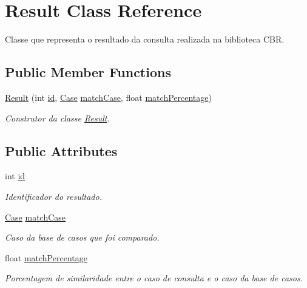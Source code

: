\hypertarget{class_result}{}\section{Result Class Reference}
\label{class_result}


Classe que representa o resultado da consulta realizada na biblioteca C\+BR.  


\subsection*{Public Member Functions}
\begin{DoxyCompactItemize}
\item 
\hyperlink{class_result_ac9674ce4ca5ac25deca347f06beb9b12}{Result} (int \hyperlink{class_result_ae4269cd3aa3565fa41da9ea75c364705}{id}, \hyperlink{class_case}{Case} \hyperlink{class_result_a715e03ca8c315d38e8e6842f3e6f710e}{match\+Case}, float \hyperlink{class_result_a591657b84ecc4e2b0c2f50e824a5c45a}{match\+Percentage})
\begin{DoxyCompactList}\small\item\em Construtor da classe \hyperlink{class_result}{Result}. \end{DoxyCompactList}\end{DoxyCompactItemize}
\subsection*{Public Attributes}
\begin{DoxyCompactItemize}
\item 
int \hyperlink{class_result_ae4269cd3aa3565fa41da9ea75c364705}{id}
\begin{DoxyCompactList}\small\item\em Identificador do resultado. \end{DoxyCompactList}\item 
\hyperlink{class_case}{Case} \hyperlink{class_result_a715e03ca8c315d38e8e6842f3e6f710e}{match\+Case}
\begin{DoxyCompactList}\small\item\em Caso da base de casos que foi comparado. \end{DoxyCompactList}\item 
float \hyperlink{class_result_a591657b84ecc4e2b0c2f50e824a5c45a}{match\+Percentage}
\begin{DoxyCompactList}\small\item\em Porcentagem de similaridade entre o caso de consulta e o caso da base de casos. \end{DoxyCompactList}\end{DoxyCompactItemize}


